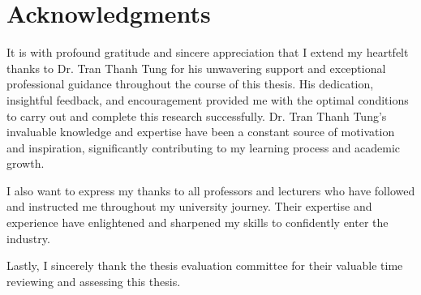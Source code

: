 \documentclass[12pt, oneside]{report}
\begin{document}
\chapter*{Acknowledgments}
\hspace{1cm}It is with profound gratitude and sincere appreciation that I extend my heartfelt thanks to Dr. Tran Thanh Tung for his unwavering support and exceptional professional guidance throughout the course of this thesis. His dedication, insightful feedback, and encouragement provided me with the optimal conditions to carry out and complete this research successfully. Dr. Tran Thanh Tung's invaluable knowledge and expertise have been a constant source of motivation and inspiration, significantly contributing to my learning process and academic growth.

\hspace{0.5cm}I also want to express my thanks to all professors and lecturers who have followed and instructed me throughout my university journey. Their expertise and experience have enlightened and sharpened my skills to confidently enter the industry.

\hspace{0.5cm}Lastly, I sincerely thank the thesis evaluation committee for their valuable time reviewing and assessing this thesis.

\thispagestyle{empty}

\tableofcontents
\listoftables
{}
\listoffigures
{}
\listofalgorithms
{}
\lstlistoflistings
{}

\end{document}
